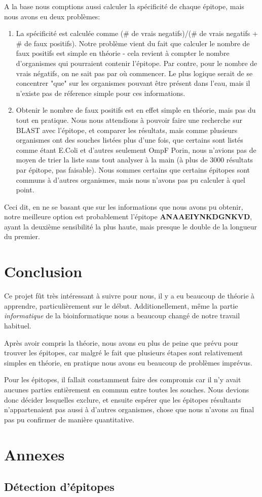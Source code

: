 \documentclass{article}
\begin{document}
    A la base nous comptions aussi calculer la spécificité de chaque épitope, mais nous avons eu deux problèmes:

    \begin{enumerate}
      \item La spécificité est calculée comme (\# de vrais negatifs)/(\# de vrais negatifs + \# de faux positifs). Notre problème vient du fait que calculer le nombre de faux positifs est simple en théorie - cela revient à compter le nombre d'organismes qui pourraient contenir l'épitope. Par contre, pour le nombre de vrais négatifs, on ne sait pas par où commencer. Le plus logique serait de se concentrer "que" sur les organismes pouvant être présent dans l'eau, mais il n'existe pas de réference simple pour ces informations.
      \item Obtenir le nombre de faux positifs est en effet simple en théorie, mais pas du tout en pratique. Nous nous attendions à pouvoir faire une recherche sur BLAST avec l'épitope, et comparer les résultats, mais comme plusieurs organismes ont des souches listées plus d'une fois, que certains sont listés comme étant E.Coli et d'autres seulement OmpF Porin, nous n'avions pas de moyen de trier la liste sans tout analyser à la main (à plus de 3000 résultats par épitope, pas faisable). Nous sommes certains que certains épitopes sont communs à d'autres organismes, mais nous n'avons pas pu calculer à quel point.
    \end{enumerate}

    Ceci dit, en ne se basant que sur les informations que nous avons pu obtenir, notre meilleure option est probablement l'épitope \textbf{ANAAEIYNKDGNKVD}, ayant la deuxième sensibilité la plus haute, mais presque le double de la longueur du premier.

  \section{Conclusion}
    Ce projet fût très intéressant à suivre pour nous, il y a eu beaucoup de théorie à apprendre, particulièrement sur le début. Additionellement, même la partie \textit{informatique} de la bioinformatique nous a beaucoup changé de notre travail habituel.

    Après avoir compris la théorie, nous avons eu plus de peine que prévu pour trouver les épitopes, car malgré le fait que plusieurs étapes sont relativement simples en théorie, en pratique nous avons eu beaucoup de problèmes imprévus.

    Pour les épitopes, il fallait constamment faire des compromis car il n'y avait aucunes parties entièrement en commun entre toutes les souches. Nous devions donc décider lesquelles exclure, et ensuite espérer que les épitopes résultants n'appartenaient pas aussi à d'autres organismes, chose que nous n'avons au final pas pu confirmer de manière quantitative.

  \newpage
  
  
  \nocite{*}

  \newpage
  \appendix
  \section{Annexes}
    \subsection{Détection d'épitopes}
\end{document}
